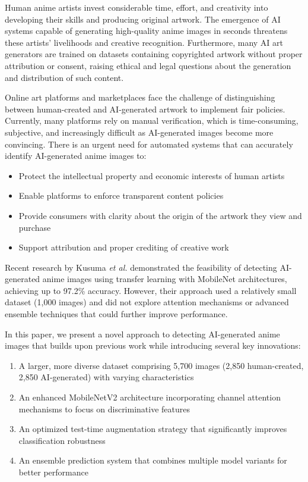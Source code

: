 \documentclass{article}
\begin{document}
Human anime artists invest considerable time, effort, and creativity into developing their skills and producing original artwork. The emergence of AI systems capable of generating high-quality anime images in seconds threatens these artists' livelihoods and creative recognition. Furthermore, many AI art generators are trained on datasets containing copyrighted artwork without proper attribution or consent, raising ethical and legal questions about the generation and distribution of such content.

Online art platforms and marketplaces face the challenge of distinguishing between human-created and AI-generated artwork to implement fair policies. Currently, many platforms rely on manual verification, which is time-consuming, subjective, and increasingly difficult as AI-generated images become more convincing. There is an urgent need for automated systems that can accurately identify AI-generated anime images to:

\begin{itemize}
    \item Protect the intellectual property and economic interests of human artists
    \item Enable platforms to enforce transparent content policies
    \item Provide consumers with clarity about the origin of the artwork they view and purchase
    \item Support attribution and proper crediting of creative work
\end{itemize}

Recent research by Kusuma \textit{et al.} \cite{kusuma2024detection} demonstrated the feasibility of detecting AI-generated anime images using transfer learning with MobileNet architectures, achieving up to 97.2\% accuracy. However, their approach used a relatively small dataset (1,000 images) and did not explore attention mechanisms or advanced ensemble techniques that could further improve performance.

In this paper, we present a novel approach to detecting AI-generated anime images that builds upon previous work while introducing several key innovations:

\begin{enumerate}
    \item A larger, more diverse dataset comprising 5,700 images (2,850 human-created, 2,850 AI-generated) with varying characteristics
    
    \item An enhanced MobileNetV2 architecture incorporating channel attention mechanisms to focus on discriminative features
    
    \item An optimized test-time augmentation strategy that significantly improves classification robustness
    
    \item An ensemble prediction system that combines multiple model variants for better performance
\end{enumerate}
\end{document}
